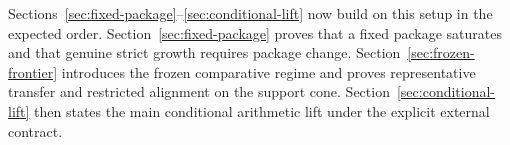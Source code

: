 \medskip\noindent
Sections~\ref{sec:fixed-package}--\ref{sec:conditional-lift} now build on this setup in the expected order. Section~\ref{sec:fixed-package} proves that a fixed package saturates and that genuine strict growth requires package change. Section~\ref{sec:frozen-frontier} introduces the frozen comparative regime and proves representative transfer and restricted alignment on the support cone. Section~\ref{sec:conditional-lift} then states the main conditional arithmetic lift under the explicit external contract.
